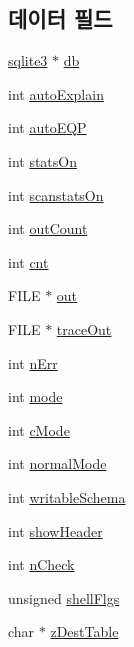 \subsection*{데이터 필드}
\begin{DoxyCompactItemize}
\item 
\hyperlink{sqlite3_8h_a0ef6f2646262c8a9b24368d8ac140f69}{sqlite3} $\ast$ \hyperlink{struct_shell_state_aff5184c68cc62f6db1876cc28ffaf7e0}{db}
\item 
int \hyperlink{struct_shell_state_a1ce80144b7c10d594fcd1cbba9b4a874}{auto\+Explain}
\item 
int \hyperlink{struct_shell_state_ab3a2de04a6ec0c08da36f5b2a8870df0}{auto\+E\+QP}
\item 
int \hyperlink{struct_shell_state_a07631569595d0bac838efef39e6e147d}{stats\+On}
\item 
int \hyperlink{struct_shell_state_aac5055c5404f54e65f52dfdab67cc49d}{scanstats\+On}
\item 
int \hyperlink{struct_shell_state_aa3830a7924f73f6ff4eb27fd11ef4a14}{out\+Count}
\item 
int \hyperlink{struct_shell_state_a2ff4d941ad9ef12844aa5281e98ef7c1}{cnt}
\item 
F\+I\+LE $\ast$ \hyperlink{struct_shell_state_afe68611d577c5398d24a790bac1b5e56}{out}
\item 
F\+I\+LE $\ast$ \hyperlink{struct_shell_state_a308c221cb2f11f68231232a18466c94f}{trace\+Out}
\item 
int \hyperlink{struct_shell_state_a014f654813021513e6bf6091926b3877}{n\+Err}
\item 
int \hyperlink{struct_shell_state_a555e4be1ff388f8fb4e71765e4b08ab2}{mode}
\item 
int \hyperlink{struct_shell_state_a85f31fbf107e9127829e4bbbd1a9b675}{c\+Mode}
\item 
int \hyperlink{struct_shell_state_abf9cf08c0a0cd37b43931ed3e6b28e82}{normal\+Mode}
\item 
int \hyperlink{struct_shell_state_a7b6ccf04e4f4174830faf39116ed74f6}{writable\+Schema}
\item 
int \hyperlink{struct_shell_state_adf90aea39543d0b710b7bb6a4d0236e3}{show\+Header}
\item 
int \hyperlink{struct_shell_state_a0afb65c2cd8e373535a1323770db0040}{n\+Check}
\item 
unsigned \hyperlink{struct_shell_state_a970dc91433f4d8d1c6776d2eb9753c6f}{shell\+Flgs}
\item 
char $\ast$ \hyperlink{struct_shell_state_a1019f63cae8d412dc13a06bb80562247}{z\+Dest\+Table}

\end{DoxyCompactItemize}
